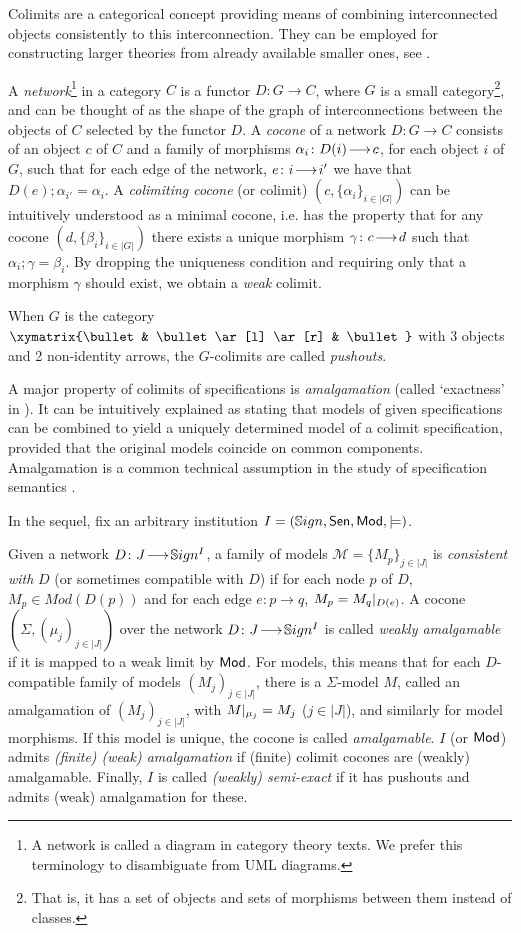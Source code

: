 \documentclass[10pt,fleqn,%
\ifpretendfinal
final%
\else
draft%
\fi,
]{scrreprt}
\begin{document}
Colimits are a categorical concept providing means of
combining interconnected objects consistently to this interconnection.
They can be employed for constructing larger theories from already available 
smaller ones, see \cite{GoguenBurstall92}. 

A \emph{network}\footnote{A network is called a diagram in category theory texts. We prefer this terminology to disambiguate 
from UML diagrams.} in a category $C$ is 
a functor $D:G\to C$, where $G$ is a small category\footnote{That is, it has a set of objects and sets of morphisms between them
instead of classes.}, and can be thought of as the shape of the graph of
interconnections between the objects of $C$ selected by the functor $D$. A \emph{cocone} of
a network $D:G\to C$ consists of an object $c$ of $C$ and a family of
morphisms $\alpha_i\colon D(i)\!\longrightarrow\!c$, for each object $i$ of $G$, such that for
each edge of the network, $e\colon i\!\longrightarrow\!i'$ we have that 
$D(e);\alpha_{i'} = \alpha_{i}$. 
A \emph{colimiting cocone} (or colimit) $(c, \{\alpha_i\}_{i\in|G|})$ can be
intuitively understood as a minimal cocone, i.e. has the property that for any 
cocone $(d, \{\beta_i\}_{i\in |G|})$ there exists a unique morphism 
$\gamma\colon c\!\longrightarrow\!d$ such that $\alpha_i;\gamma = \beta_i$. By dropping the 
uniqueness condition and requiring only that a morphism $\gamma$ should exist,
we obtain a \emph{weak} colimit. 

When $G$ is the category $\xymatrix{\bullet & \bullet \ar[l] \ar[r]
& \bullet }$ with 3 objects and 2 non-identity arrows, the $G$-colimits are
called  \emph{pushouts}.  

A major property of colimits of specifications is \emph{amalgamation} (called `exactness' in \cite{DGS91}). It can be intuitively explained as 
stating that models of given
specifications can be combined to yield a uniquely determined model of
a colimit specification, provided that the original models coincide on
common components. Amalgamation is a common technical assumption in the 
study of specification semantics
\cite{STbook}.

In the sequel, fix an arbitrary institution
$I=(\mathbb{S}ign,\mathsf{Sen},\mathsf{Mod},\models)$.  

\begin{definition}
Given a network $D\colon J\!\longrightarrow\!\mathbb{S}ign^I$, 
a family of models $\mathcal{M} = \{M_p\}_{j\in |J|}$ is
\emph{consistent with} $D$ (or sometimes compatible with $D$) 
if for each node $p$ of $D$, $M_p \in Mod(D(p))$ and
for each edge $e:p\rightarrow q$, $M_p = M_q|_{D(e)}$.
  A cocone
$(\Sigma,(\mu_j)_{j\in|J|})$ over the network $D\colon J\!\longrightarrow\!\mathbb{S}ign^I$ is
called \emph{weakly amalgamable} if it is mapped to a weak limit by $\mathsf{Mod}$.
For models, this means that for each $D$-compatible family of
models $(M_j)_{j\in|J|}$, there is a $\Sigma$-model $M$, called an amalgamation of 
 $(M_j)_{j\in|J|}$,
with
$M|_{\mu_j}=M_j$ ($j\in|J|$), and similarly for model morphisms.
 If this model is unique, the cocone
is called \emph{amalgamable}. 
$I$ (or $\mathsf{Mod}$) admits \emph{(finite) (weak)
amalgamation} if (finite) colimit cocones are (weakly) amalgamable.
Finally, $I$ is called \emph{(weakly) semi-exact} if 
it has pushouts and admits (weak) amalgamation for these.
\end{definition}
\end{document}
